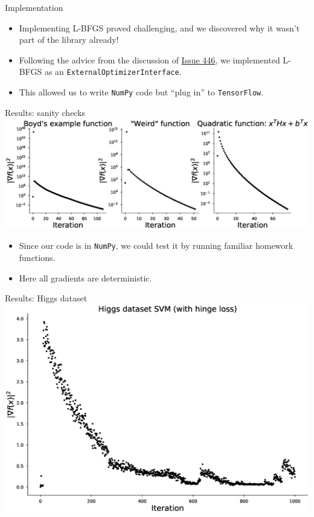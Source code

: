 \documentclass{beamer}
\begin{document}
\begin{frame}[t]{Implementation}
  \begin{itemize}
    \item Implementing L-BFGS proved challenging, and we discovered why it wasn't
      part of the library already!
    \item Following the advice from the discussion of 
      \href{https://github.com/tensorflow/tensorflow/issues/446}{Issue 446}, we
      implemented L-BFGS as an \texttt{ExternalOptimizerInterface}.
    \item This allowed us to write \texttt{NumPy} code but ``plug in'' to
      \texttt{TensorFlow}.
  \end{itemize}
\end{frame}

\begin{frame}[t]{Results: sanity checks}
  \includegraphics[width=\textwidth]{../plots/sanity_checks.eps} 
  \begin{itemize}
    \item Since our code is in \texttt{NumPy}, we could test it by running
      familiar homework functions.
    \item Here all gradients are deterministic.
  \end{itemize}
\end{frame}


\begin{frame}[t]{Results: Higgs dataset}
  \includegraphics[width=\textwidth]{../plots/higgs_dataset.eps} 
\end{frame}

\begin{frame}
  
\end{frame}
\end{document}
